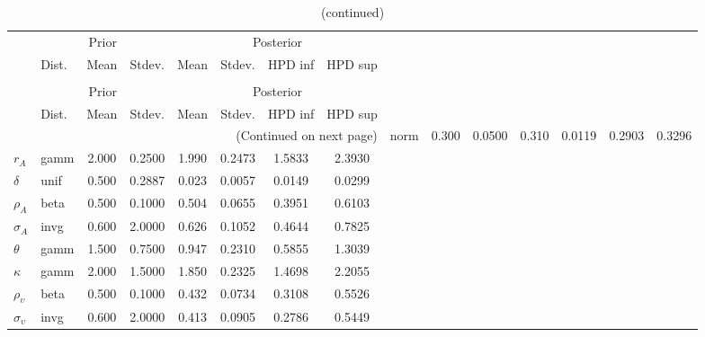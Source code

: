  
\begin{center}
\begin{longtable}{llcccccc} 
\caption{Results from Metropolis-Hastings (parameters)}
 \label{Table:MHPosterior:1}\\
\toprule 
  & \multicolumn{3}{c}{Prior}  &  \multicolumn{4}{c}{Posterior} \\
  \cmidrule(r{.75em}){2-4} \cmidrule(r{.75em}){5-8}
  & Dist. & Mean  & Stdev. & Mean & Stdev. & HPD inf & HPD sup\\
\midrule \endfirsthead 
\caption{(continued)}\\\toprule 
  & \multicolumn{3}{c}{Prior}  &  \multicolumn{4}{c}{Posterior} \\
  \cmidrule(r{.75em}){2-4} \cmidrule(r{.75em}){5-8}
  & Dist. & Mean  & Stdev. & Mean & Stdev. & HPD inf & HPD sup\\
\midrule \endhead 
\bottomrule \multicolumn{8}{r}{(Continued on next page)} \endfoot 
\bottomrule \endlastfoot 
${\alpha}$ & norm &   0.300 & 0.0500 &   0.310& 0.0119 &  0.2903 &  0.3296 \\ 
${r_{A}}$ & gamm &   2.000 & 0.2500 &   1.990& 0.2473 &  1.5833 &  2.3930 \\ 
${\delta}$ & unif &   0.500 & 0.2887 &   0.023& 0.0057 &  0.0149 &  0.0299 \\ 
${\rho_A}$ & beta &   0.500 & 0.1000 &   0.504& 0.0655 &  0.3951 &  0.6103 \\ 
${\sigma_A}$ & invg &   0.600 & 2.0000 &   0.626& 0.1052 &  0.4644 &  0.7825 \\ 
${\theta}$ & gamm &   1.500 & 0.7500 &   0.947& 0.2310 &  0.5855 &  1.3039 \\ 
${\kappa}$ & gamm &   2.000 & 1.5000 &   1.850& 0.2325 &  1.4698 &  2.2055 \\ 
${\rho_\upsilon}$ & beta &   0.500 & 0.1000 &   0.432& 0.0734 &  0.3108 &  0.5526 \\ 
${\sigma_\upsilon}$ & invg &   0.600 & 2.0000 &   0.413& 0.0905 &  0.2786 &  0.5449 \\ 
\end{longtable}
 \end{center}
